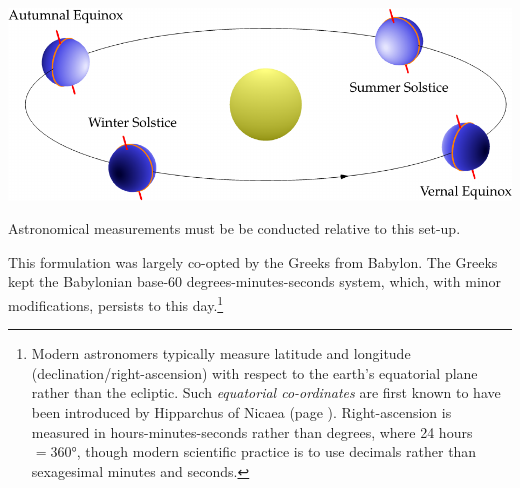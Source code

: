 \begin{center}
	\href{http://www.math.uci.edu/~ndonalds/math184/ecliptic.html}{\includegraphics[scale=0.95]{ecliptic}}
\end{center}

Astronomical measurements must be be conducted relative to this set-up.


This formulation was largely co-opted by the Greeks from Babylon. The Greeks kept the Babylonian base-60 degrees-minutes-seconds system, which, with minor modifications, persists to this day.\footnote{%
	Modern astronomers typically measure latitude and longitude (declination/right-ascension) with respect to the earth's equatorial plane rather than the ecliptic. Such \emph{equatorial co-ordinates} are first known to have been introduced by Hipparchus of Nicaea (page \pageref{ssec:hipparchus}). Right-ascension is measured in hours-minutes-seconds rather than degrees, where 24 hours $=\ang{360}$, though modern scientific practice is to use decimals rather than sexagesimal minutes and seconds.%
}


